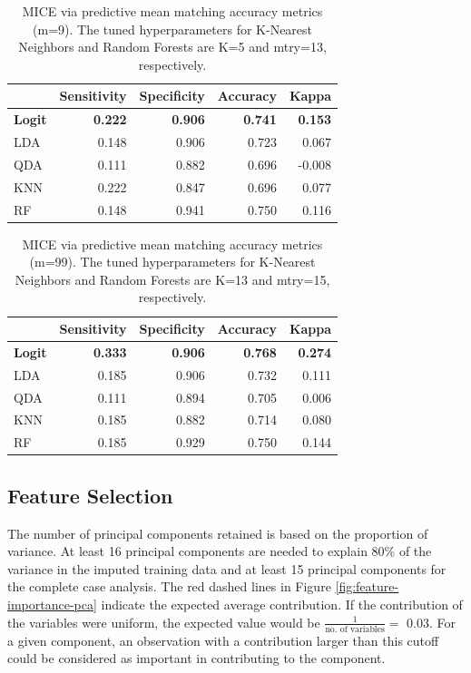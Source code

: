 \documentclass[12pt,]{article}
\begin{document}
\begin{table}[!h]

\caption{\label{tab:unnamed-chunk-8}\label{tab:pmm-metrics} MICE via predictive mean matching accuracy metrics (m=9).  The tuned hyperparameters for K-Nearest Neighbors and Random Forests are K=5 and mtry=13, respectively.}
\centering
\fontsize{10}{12}\selectfont
\begin{tabular}{lrrrr}
\toprule
  & Sensitivity & Specificity & Accuracy & Kappa\\
\midrule
\textbf{Logit} & \textbf{0.222} & \textbf{0.906} & \textbf{0.741} & \textbf{0.153}\\
LDA & 0.148 & 0.906 & 0.723 & 0.067\\
QDA & 0.111 & 0.882 & 0.696 & -0.008\\
KNN & 0.222 & 0.847 & 0.696 & 0.077\\
RF & 0.148 & 0.941 & 0.750 & 0.116\\
\bottomrule
\end{tabular}
\end{table}

\begin{table}[!h]

\caption{\label{tab:unnamed-chunk-9}\label{tab:pmm99-metrics} MICE via predictive mean matching accuracy metrics (m=99).  The tuned hyperparameters for K-Nearest Neighbors and Random Forests are K=13 and mtry=15, respectively.}
\centering
\fontsize{10}{12}\selectfont
\begin{tabular}{lrrrr}
\toprule
  & Sensitivity & Specificity & Accuracy & Kappa\\
\midrule
\textbf{Logit} & \textbf{0.333} & \textbf{0.906} & \textbf{0.768} & \textbf{0.274}\\
LDA & 0.185 & 0.906 & 0.732 & 0.111\\
QDA & 0.111 & 0.894 & 0.705 & 0.006\\
KNN & 0.185 & 0.882 & 0.714 & 0.080\\
RF & 0.185 & 0.929 & 0.750 & 0.144\\
\bottomrule
\end{tabular}
\end{table}

\subsection{Feature Selection}\label{feature-selection-1}

The number of principal components retained is based on the proportion
of variance. At least 16 principal components are needed to explain 80\%
of the variance in the imputed training data and at least 15 principal
components for the complete case analysis. The red dashed lines in
Figure \ref{fig:feature-importance-pca} indicate the expected average
contribution. If the contribution of the variables were uniform, the
expected value would be \(\frac{1}{\text{no. of variables}} =\) 0.03.
For a given component, an observation with a contribution larger than
this cutoff could be considered as important in contributing to the
component.
\end{document}
